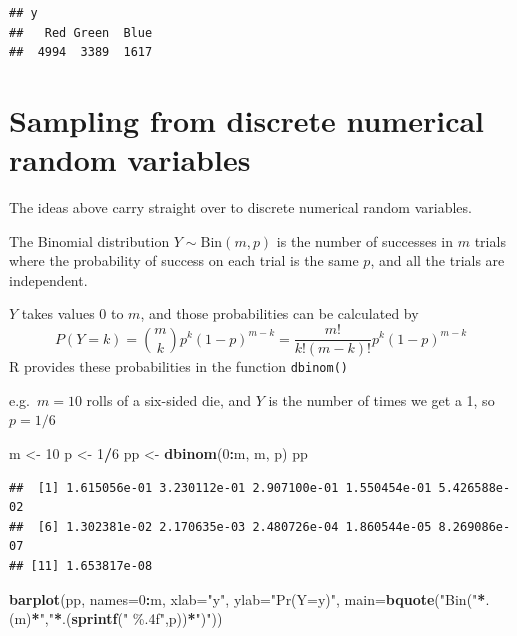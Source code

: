 \documentclass[
]{book}
\newenvironment{Shaded}{\begin{snugshade}}{\end{snugshade}}
\newcommand{\AttributeTok}[1]{\textcolor[rgb]{0.13,0.29,0.53}{#1}}
\newcommand{\DecValTok}[1]{\textcolor[rgb]{0.00,0.00,0.81}{#1}}
\newcommand{\FunctionTok}[1]{\textcolor[rgb]{0.13,0.29,0.53}{\textbf{#1}}}
\newcommand{\NormalTok}[1]{#1}
\newcommand{\OtherTok}[1]{\textcolor[rgb]{0.56,0.35,0.01}{#1}}
\newcommand{\SpecialCharTok}[1]{\textcolor[rgb]{0.81,0.36,0.00}{\textbf{#1}}}
\newcommand{\StringTok}[1]{\textcolor[rgb]{0.31,0.60,0.02}{#1}}
\begin{document}
\begin{verbatim}
## y
##   Red Green  Blue 
##  4994  3389  1617
\end{verbatim}

\section{Sampling from discrete numerical random variables}\label{sampling-from-discrete-numerical-random-variables}

The ideas above carry straight over to discrete numerical random variables.

The Binomial distribution \(Y\sim\text{Bin}(m,p)\) is the number
of successes in \(m\) trials where the probability of success on each
trial is the same \(p\), and all the trials are independent.

\(Y\) takes values 0 to \(m\), and those probabilities can be calculated by
\[
   P(Y=k) = \binom{m}{k} p^k (1-p)^{m-k} = \frac{m!}{k!(m-k)!} p^k (1-p)^{m-k}
\]
R provides these probabilities in the function \texttt{dbinom()}

e.g.~\(m=10\) rolls of a six-sided die, and \(Y\) is the number of times we get a 1,
so \(p=1/6\)

\begin{Shaded}
\begin{Highlighting}[]
\NormalTok{m }\OtherTok{\textless{}{-}} \DecValTok{10}
\NormalTok{p }\OtherTok{\textless{}{-}} \DecValTok{1}\SpecialCharTok{/}\DecValTok{6}
\NormalTok{pp }\OtherTok{\textless{}{-}} \FunctionTok{dbinom}\NormalTok{(}\DecValTok{0}\SpecialCharTok{:}\NormalTok{m, m, p)}
\NormalTok{pp}
\end{Highlighting}
\end{Shaded}

\begin{verbatim}
##  [1] 1.615056e-01 3.230112e-01 2.907100e-01 1.550454e-01 5.426588e-02
##  [6] 1.302381e-02 2.170635e-03 2.480726e-04 1.860544e-05 8.269086e-07
## [11] 1.653817e-08
\end{verbatim}

\begin{Shaded}
\begin{Highlighting}[]
\FunctionTok{barplot}\NormalTok{(pp, }\AttributeTok{names=}\DecValTok{0}\SpecialCharTok{:}\NormalTok{m,}
        \AttributeTok{xlab=}\StringTok{"y"}\NormalTok{, }\AttributeTok{ylab=}\StringTok{"Pr(Y=y)"}\NormalTok{,}
        \AttributeTok{main=}\FunctionTok{bquote}\NormalTok{(}\StringTok{"Bin("}\SpecialCharTok{*}\NormalTok{.(m)}\SpecialCharTok{*}\StringTok{","}\SpecialCharTok{*}\NormalTok{.(}\FunctionTok{sprintf}\NormalTok{(}\StringTok{" \%.4f"}\NormalTok{,p))}\SpecialCharTok{*}\StringTok{")"}\NormalTok{))}
\end{Highlighting}
\end{Shaded}
\end{document}
